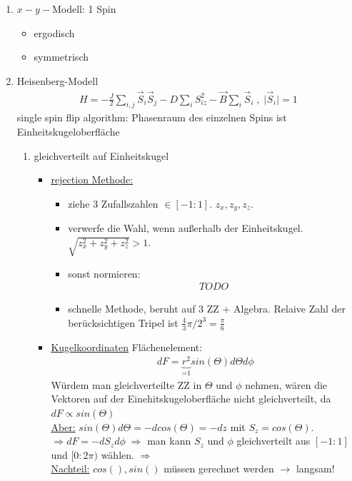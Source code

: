 \documentclass[12pt]{article}
\begin{document}
\begin{enumerate}
\item $x-y-$Modell: 1 Spin

\begin{itemize}
\item ergodisch
\item symmetrisch
\end{itemize}

\item Heisenberg-Modell
\begin{align}
H= -\frac{J}{2} \sum_{i,j} \vec{S}_i \vec{S}_j - D \sum_i S_{iz}^2 - \vec{B} \sum_i \vec{S}_i\; , \; \vert \vec{S}_i \vert =1
\end{align}
single spin flip algorithm: Phasenraum des einzelnen Spins ist Einheitskugeloberfläche %

\begin{enumerate}
		\item gleichverteilt auf Einheitskugel
			\begin{itemize}
				\item \underline{rejection Methode:}
					\begin{itemize}
						\item  ziehe 3 Zufallszahlen $\in [ -1:1]$. $z_x, 		z_y, z_z$. 
						\item verwerfe die Wahl, wenn außerhalb der Einheitskugel. $\sqrt{z_x^2 + z_y^2 +z_z^2}>1$.
						\item sonst normieren: 
							\begin{align}
							TODO
							\end{align}
					\item schnelle Methode, beruht auf 3 ZZ + Algebra. Relaive Zahl der berücksichtigen Tripel ist $ \frac{4}{3} \pi / 2^3 = \frac{\pi}{6}$
					\end{itemize}				
			\item \underline{Kugelkoordinaten} Flächenelement:
			\begin{align}
			dF= \underbrace{r^2}_\text{=1} sin(\Theta) d \Theta d\phi
			\end{align}	
			Würdem man gleichverteilte ZZ in $\Theta$ und $\phi$ nehmen, wären die Vektoren auf der Einehitskugeloberfläche nicht gleichverteilt, da $dF \propto sin(\Theta)$ \\
			\underline{Aber:} $sin(\Theta) d\Theta = - d cos(\Theta) = -dz$ mit $S_z =cos(\Theta)$. \\
			$\Rightarrow dF= - d S_z d \phi \; \Rightarrow$ man kann $S_z$ und $\phi$ gleichverteilt aus $[-1:1]$ und $[0:2\pi)$ wählen. $\Rightarrow$ %
			\\ \underline{Nachteil:} $cos(),sin()$ müssen gerechnet werden $\to$ langsam!			
			\end{itemize}
			

\end{enumerate}
\end{enumerate}
\end{document}
